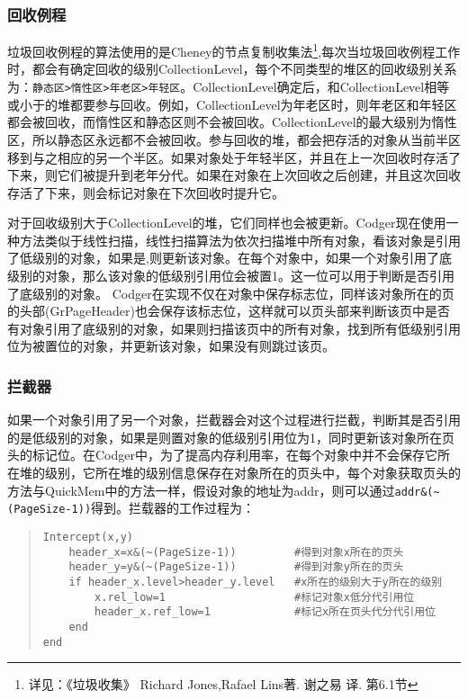 \subsubsection{回收例程}
垃圾回收例程的算法使用的是Cheney的节点复制收集法\footnote{详见：《垃圾收集》 Richard Jones,Rafael Lins著. 谢之易 译. 第6.1节},每次当垃圾回收例程工作时，都会有确定回收的级别CollectionLevel，每个不同类型的堆区的回收级别关系为：\verb|静态区>惰性区>年老区>年轻区|。CollectionLevel确定后，和CollectionLevel相等或小于的堆都要参与回收。例如，CollectionLevel为年老区时，则年老区和年轻区都会被回收，而惰性区和静态区则不会被回收。CollectionLevel的最大级别为惰性区，所以静态区永远都不会被回收。参与回收的堆，都会把存活的对象从当前半区移到与之相应的另一个半区。如果对象处于年轻半区，并且在上一次回收时存活了下来，则它们被提升到老年分代。如果在对象在上次回收之后创建，并且这次回收存活了下来，则会标记对象在下次回收时提升它。

对于回收级别大于CollectionLevel的堆，它们同样也会被更新。Codger现在使用一种方法类似于线性扫描，线性扫描算法为依次扫描堆中所有对象，看该对象是引用了低级别的对象，如果是,则更新该对象。在每个对象中，如果一个对象引用了底级别的对象，那么该对象的低级别引用位会被置1。这一位可以用于判断是否引用了底级别的对象。
Codger在实现不仅在对象中保存标志位，同样该对象所在的页的头部(GrPageHeader)也会保存该标志位，这样就可以页头部来判断该页中是否有对象引用了底级别的对象，如果则扫描该页中的所有对象，找到所有低级别引用位为被置位的对象，并更新该对象，如果没有则跳过该页。

\subsubsection{拦截器}
如果一个对象引用了另一个对象，拦截器会对这个过程进行拦截，判断其是否引用的是低级别的对象，如果是则置对象的低级别引用位为1，同时更新该对象所在页头的标记位。在Codger中，为了提高内存利用率，在每个对象中并不会保存它所在堆的级别，它所在堆的级别信息保存在对象所在的页头中，每个对象获取页头的方法与QuickMem中的方法一样，假设对象的地址为addr，则可以通过\verb|addr&(~(PageSize-1))|得到。拦载器的工作过程为：
\begin{quote}
\begin{verbatim}
Intercept(x,y)
    header_x=x&(~(PageSize-1))         #得到对象x所在的页头
    header_y=y&(~(PageSize-1))         #得到对象y所在的页头
    if header_x.level>header_y.level   #x所在的级别大于y所在的级别
        x.rel_low=1                    #标记对象x低分代引用位
        header_x.ref_low=1             #标记x所在页头代分代引用位
    end
end
\end{verbatim}
\end{quote}

